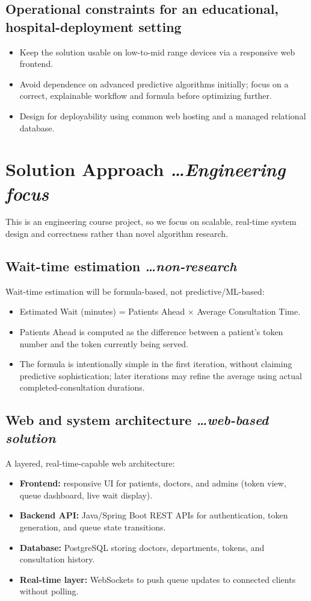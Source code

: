 \documentclass[11pt,a4paper]{article}
\newcommand{\BvrHint}[1]{%
  {\normalfont\normalsize\itshape\hfill #1}}
\begin{document}
\subsection{Operational constraints for an educational, hospital-deployment setting}
\begin{itemize}[leftmargin=0.7cm]
    \item Keep the solution usable on low-to-mid range devices via a responsive web frontend.
    \item Avoid dependence on advanced predictive algorithms initially; focus on a correct, explainable workflow and formula before optimizing further.
    \item Design for deployability using common web hosting and a managed relational database.
\end{itemize}

\section{Solution Approach %
\BvrHint{\ldots Engineering focus}}
This is an engineering course project, so we focus on scalable, real-time system design and correctness rather than novel algorithm research.

\subsection{Wait-time estimation %
\BvrHint{\ldots non-research}}
Wait-time estimation will be formula-based, not predictive/ML-based:
\begin{itemize}[leftmargin=0.7cm]
    \item Estimated Wait (minutes) = Patients Ahead $\times$ Average Consultation Time.
    \item Patients Ahead is computed as the difference between a patient's token number and the token currently being served.
    \item The formula is intentionally simple in the first iteration, without claiming predictive sophistication; later iterations may refine the average using actual completed-consultation durations.
\end{itemize}

\subsection{Web and system architecture %
\BvrHint{\ldots web-based solution}}
A layered, real-time-capable web architecture:
\begin{itemize}[leftmargin=0.7cm]
    \item \textbf{Frontend:} responsive UI for patients, doctors, and admins (token view, queue dashboard, live wait display).
    \item \textbf{Backend API:} Java/Spring Boot REST APIs for authentication, token generation, and queue state transitions.
    \item \textbf{Database:} PostgreSQL storing doctors, departments, tokens, and consultation history.
    \item \textbf{Real-time layer:} WebSockets to push queue updates to connected clients without polling.
\end{itemize}
\end{document}
